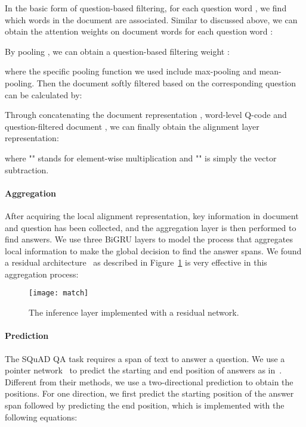 \documentclass{article}
\begin{document}
In the basic form of question-based filtering, for each question word , we find which words in the document are associated. Similar to  discussed above, we can obtain the attention weights on document words for each question word :

By pooling , we can obtain a question-based filtering weight :


where the specific pooling function we used include max-pooling and mean-pooling. Then the document softly filtered based on the corresponding question   can be calculated by:



Through concatenating the document representation , word-level Q-code  and question-filtered document , we can finally obtain the alignment layer representation:

where "" stands for element-wise multiplication and "" is simply the vector subtraction.

\paragraph{Aggregation}
After acquiring the local alignment representation, key information in document and question has been collected, and the aggregation layer is then performed to find answers. We use three BiGRU layers to model the process that aggregates local information to make the global decision to find the answer spans. We found a residual architecture~\citep{he2016deep} as described in Figure~\ref{fig:inference} is very effective in this aggregation process:




\begin{figure}[h]
	\centering
	\texttt{[image: match]}
	\caption{The inference layer implemented with a residual network.}
	\label{fig:inference}
\end{figure}

\paragraph{Prediction}
The SQuAD QA task requires a span of text to answer a question. We use a pointer network~\citep{vinyals2015pointer} to predict the starting and end position of answers as in~\citep{wang2016machine}. Different from their methods, we use a two-directional prediction to obtain the positions. For one direction, we first predict the starting position of the answer span followed by predicting the end position, which is implemented with the following equations:
\end{document}
